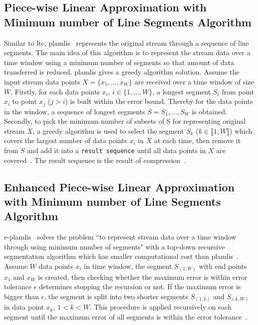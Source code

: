 \subsection{Piece-wise Linear Approximation
with Minimum number of Line Segments Algorithm}

Similar to \acrshort{ltc}, \acrfull{plamlis}~\cite{liu2007energy} represents the
original stream through a sequence of line segments. The main idea of this
algorithm is to represent the stream data over a time window using a minimum
number of segments so that amount of data transferred is reduced.
\acrshort{plamlis} gives a greedy algorithm solution. Assume the input stream
data points $X=\{x_1, ..., x_W\}$ are received over a time window of size $W$.
Firstly, for each data points $x_i$, $i \in \{1, ..., W\}$, a longest segment
$S_{i}$ from point $x_i$ to point $x_j$ ($j>i$) is built within the error bound.
Thereby for the data points in the window, a sequence of longest segments $S =
{S_1, ..., S_W}$ is obtained. Secondly, to pick the minimum number of subsets of
S for representing original stream $X$, a greedy algorithm is used to select the
segment $S_k$ ($k \in \llbracket1, W\rrbracket$) which covers the largest number
of data points $x_i$ in $X$ at each time, then remove it from $S$ and add it
into a \texttt{result sequence} until all data points in $X$ are
covered~\cite{liu2007energy}. The result sequence is the result of
compression~\cite{zordan2012compress, zordan2014performance}.


\subsection{Enhanced Piece-wise Linear Approximation with Minimum number of Line
Segments Algorithm}

\acrfull{e-plamlis}~\cite{pham2008enhance} solves the problem ``to represent
stream data over a time window through using minimum number of segments" with a
top-down recursive segmentation algorithm which has smaller computational cost
than \acrshort{plamlis}~\cite{pham2008enhance, zordan2014performance}. Assume
$W$ data points $x_i$ in time window, the segment $S_{(1, W)}$ with end points
$x_1$ and $x_W$ is created, then checking whether the maximum error is within
error tolerance $\epsilon$ determines stopping the recursion or not. If the
maximum error is bigger than $\epsilon$, the segment is split into two shorter
segments $S_{(1, k)}$ and $S_{(k, W)}$ in data point $x_k$, $1<k<W$. This
procedure is applied recursively on each segment until the maximum error of all
segments is within the error tolerance~\cite{pham2008enhance,
zordan2014performance}.

